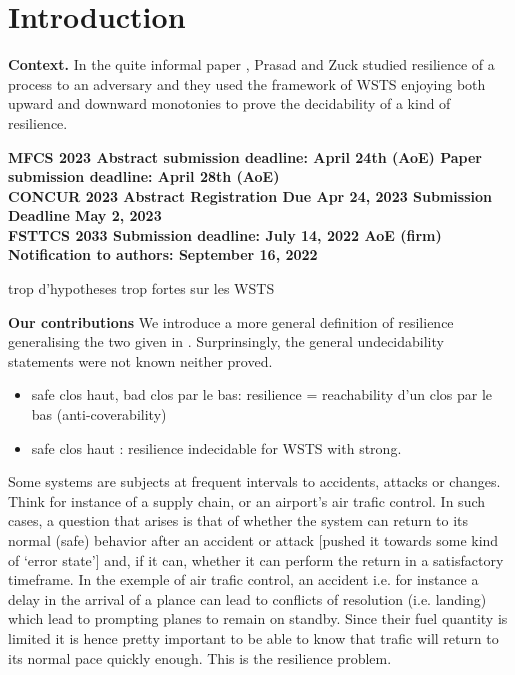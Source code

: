 \section{Introduction}\label{section introduction}


{\bf Context.} In the quite informal paper \cite{DBLP:journals/corr/PrasadZ16}, Prasad and Zuck studied resilience of a process to an adversary and they used the framework of WSTS enjoying both upward and downward monotonies to prove the decidability of a kind of resilience.

{\bf MFCS 2023
Abstract submission deadline:    	 April 24th (AoE) 
Paper submission deadline:    	April 28th (AoE)} \\
%
{\bf CONCUR 2023 Abstract Registration Due 	Apr 24, 2023
Submission Deadline 	May 2, 2023}\\
%
{\bf FSTTCS 2033  Submission deadline: July 14, 2022 AoE (firm)
Notification to authors: September 16, 2022}

trop d'hypotheses trop fortes sur les WSTS

{\bf Our contributions}
We introduce a more general definition of resilience generalising the two given in \cite{DBLP:conf/gg/Ozkan22}.
Surprinsingly, the general undecidability statements were not known neither proved.

\begin{itemize}

\item safe clos haut, bad clos par le bas: resilience = reachability d'un clos par le bas (anti-coverability)

\item safe clos haut : resilience indecidable for WSTS with strong.

\end{itemize}



Some systems are subjects at frequent intervals to accidents, attacks or changes. Think for instance of a supply chain, or an airport’s air trafic control. In such cases, a question that arises is that of whether the system can return to its normal (safe) behavior after an accident or attack [pushed it towards some kind of ‘error state’] and, if it can, whether it can perform the return in a satisfactory timeframe. In the exemple of air trafic control, an accident i.e. for instance a delay in the arrival of a plance can lead to conflicts of resolution (i.e. landing) which lead to prompting planes to remain on standby. Since their fuel quantity is limited it is hence pretty important to be able to know that trafic will return to its normal pace quickly enough. This is the resilience problem. 

